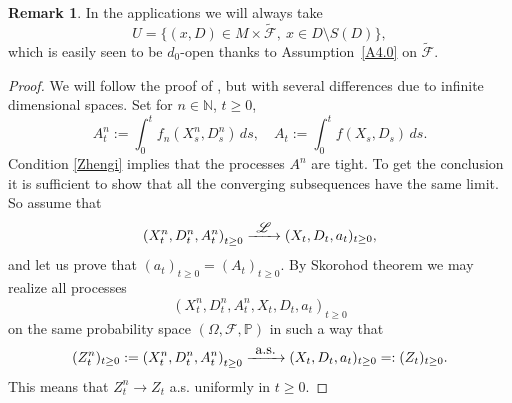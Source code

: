 \documentclass[10pt]{amsart}
\let\backslash\setminus
\newcommand\To[1]{\mathchoice{\xrightarrow{\textstyle\kern4pt#1\kern3pt}}{\stackrel{#1}{\longrightarrow}}{}{}}
\theoremstyle{plain}
\theoremstyle{definition}
\newtheorem{remark}[thm]{Remark}
\newcommand{\NN}{{\mathbb N}}
\newcommand{\PP}{{\mathbb P}}
\newcommand{\SF}{{\mathscr F}}
\newcommand{\SL}{{\mathscr L}}
\let\di\displaystyle
\let\Om\Omega
\begin{document}
\begin{remark}
\label{HR1}
In the applications we will always take\vspace*{-3pt}
\begin{equation}
\label{H3}
U=\bigl\{(x,D)\in M\times \tilde\SF, \ x\in D\backslash S(D)\bigr\},
\end{equation}
which is easily seen to be $d_0$-open thanks to Assumption~\ref{A4.0} on $\tilde\SF$.
\end{remark}
\begin{proof}
We will follow the proof of \cite[Lem.\,4]{Zheng:85}, but with several differences due to infinite dimensional spaces. Set for $n\in \NN$, $t\ge 0$,\vspace*{-3pt}
\begin{equation}
\label{H4}
A_t^n:=\int_0^tf_n(X_s^n, D_s^n)\, ds, \quad A_t:=\int_0^tf(X_s, D_s)\, ds.
\end{equation}
Condition \eqref{Zhengi} implies that the processes $A^n$ are tight.
To get the conclusion it is sufficient to show that all the converging subsequences have the same limit. So assume that\vspace*{-3pt}
\begin{equation}
\left( X_t^n, D_t^n, A_t^n\right)_{t\ge 0} \To{\SL}( X_t, D_t, a_t)_{t\ge 0},
\end{equation}
and let us prove that $\di( a_t)_{t\ge 0}= \left( A_t\right)_{t\ge 0}$.
By Skorohod theorem we may realize all processes\vspace*{-3pt}
\begin{equation}
\left( X_t^n, D_t^n, A_t^n, X_t, D_t, a_t\right)_{t\ge 0}
\end{equation}
on the same probability space $(\Om,\SF, \PP)$ in such a way that
\begin{equation}
\label{H7}
(Z_t^n)_{t\ge 0}:=\left( X_t^n, D_t^n, A_t^n\right)_{t\ge 0} \To{\text{a.s.}}( X_t, D_t, a_t)_{t\ge 0}=:(Z_t)_{t\ge 0}.
\end{equation}
This means that $Z_t^n\to Z_t$ a.s. uniformly in $t\ge 0$.


\end{proof}
\end{document}
